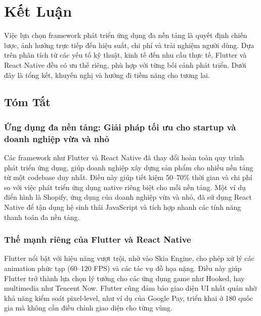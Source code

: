 \section{Kết Luận}


  \hspace*{0.8cm}Việc lựa chọn framework phát triển ứng dụng đa nền tảng là quyết định chiến lược, ảnh hưởng trực tiếp đến hiệu suất, chi phí và trải nghiệm người dùng. Dựa trên phân tích từ các yếu tố kỹ thuật, kinh tế đến nhu cầu thực tế, Flutter và React Native đều có ưu thế riêng, phù hợp với từng bối cảnh phát triển. Dưới đây là tổng kết, khuyến nghị và hướng đi tiềm năng cho tương lai.
\vspace{0.5em}

\subsection{Tóm Tắt}
\subsubsection{Ứng dụng đa nền tảng: Giải pháp tối ưu cho startup và doanh nghiệp vừa và nhỏ}

    \hspace*{0.8cm}Các framework như Flutter và React Native đã thay đổi hoàn toàn quy trình phát triển ứng dụng, giúp doanh nghiệp xây dựng sản phẩm cho nhiều nền tảng từ một codebase duy nhất. Điều này giúp tiết kiệm 50–70\% thời gian và chi phí so với việc phát triển ứng dụng native riêng biệt cho mỗi nền tảng. Một ví dụ điển hình là Shopify, ứng dụng của doanh nghiệp vừa và nhỏ, đã sử dụng React Native để tận dụng hệ sinh thái JavaScript và tích hợp nhanh các tính năng thanh toán đa nền tảng.
\vspace{0.5em}

\subsubsection{Thế mạnh riêng của Flutter và React Native}

    \hspace*{0.8cm}Flutter nổi bật với hiệu năng vượt trội, nhờ vào Skia Engine, cho phép xử lý các animation phức tạp (60–120 FPS) và các tác vụ đồ họa nặng. Điều này giúp Flutter trở thành lựa chọn lý tưởng cho các ứng dụng game như Hooked, hay multimedia như Tencent Now. Flutter cũng đảm bảo giao diện UI nhất quán nhờ khả năng kiểm soát pixel-level, như ví dụ của Google Pay, triển khai ở 180 quốc gia mà không cần điều chỉnh giao diện cho từng vùng.
\vspace{0.5em}


